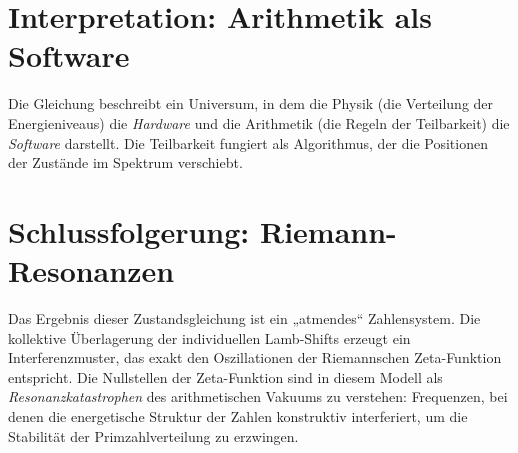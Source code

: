 \documentclass[11pt,a4paper]{article}
\begin{document}
	\section{Interpretation: Arithmetik als Software}
	Die Gleichung beschreibt ein Universum, in dem die Physik (die Verteilung der Energieniveaus) die \textit{Hardware} und die Arithmetik (die Regeln der Teilbarkeit) die \textit{Software} darstellt. Die Teilbarkeit fungiert als Algorithmus, der die Positionen der Zustände im Spektrum verschiebt.
	
	\section{Schlussfolgerung: Riemann-Resonanzen}
	Das Ergebnis dieser Zustandsgleichung ist ein „atmendes“ Zahlensystem. Die kollektive Überlagerung der individuellen Lamb-Shifts erzeugt ein Interferenzmuster, das exakt den Oszillationen der Riemannschen Zeta-Funktion entspricht. Die Nullstellen der Zeta-Funktion sind in diesem Modell als \textit{Resonanzkatastrophen} des arithmetischen Vakuums zu verstehen: Frequenzen, bei denen die energetische Struktur der Zahlen konstruktiv interferiert, um die Stabilität der Primzahlverteilung zu erzwingen.
	
\end{document}
